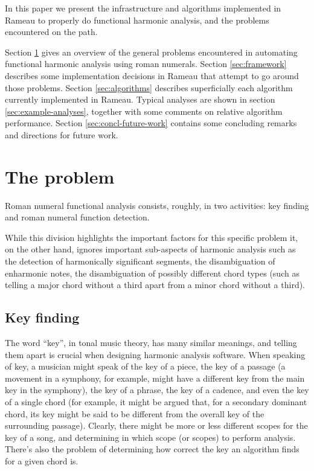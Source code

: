 In this paper we present the infrastructure and algorithms implemented
in Rameau to properly do functional harmonic analysis, and the
problems encountered on the path.

Section \ref{sec:problem} gives an overview of the general problems
encountered in automating functional harmonic analysis using roman
numerals. Section \ref{sec:framework} describes some implementation
decisions in Rameau that attempt to go around those problems. Section
\ref{sec:algorithms} describes superficially each algorithm currently
implemented in Rameau. Typical analyses are shown in section
\ref{sec:example-analyses}, together with some comments on relative
algorithm performance. Section \ref{sec:concl-future-work} contains
some concluding remarks and directions for future work.

\section{The problem}
\label{sec:problem}

Roman numeral functional analysis consists, roughly, in two
activities: key finding and roman numeral function detection. 

While this division highlights the important factors for this specific
problem it, on the other hand, ignores important sub-aspects of
harmonic analysis such as the detection of harmonically significant
segments, the disambiguation of enharmonic notes, the disambiguation
of possibly different chord types (such as telling a major chord
without a third apart from a minor chord without a third).


\subsection{Key finding}
\label{sec:key-finding}


The word ``key'', in tonal music theory, has many similar meanings,
and telling them apart is crucial when designing harmonic analysis
software. When speaking of key, a musician might speak of the key of a
piece, the key of a passage (a movement in a symphony, for example,
might have a different key from the main key in the symphony), the key
of a phrase, the key of a cadence, and even the key of a single chord
(for example, it might be argued that, for a secondary dominant chord,
its key might be said to be different from the overall key of the
surrounding passage). Clearly, there might be more or less different
scopes for the key of a song, and determining in which scope (or
scopes) to perform analysis. There's also the problem of determining
how correct the key an algorithm finds for a given chord is.

